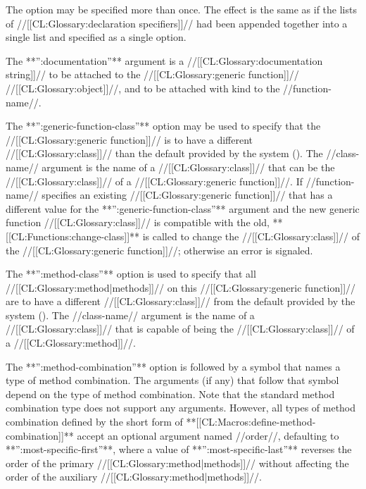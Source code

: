 The  option may be specified more than once. The effect is the same as if the lists of //[[CL:Glossary:declaration specifiers]]// had been appended together into a single list and specified as a single  option.

\itemitem{\bull} The **'':documentation''** argument is a //[[CL:Glossary:documentation string]]// to be attached to the //[[CL:Glossary:generic function]]// //[[CL:Glossary:object]]//, and to be attached with kind  to the //function-name//.

\itemitem{\bull} The **'':generic-function-class''** option may be used to specify that the //[[CL:Glossary:generic function]]// is to have a different //[[CL:Glossary:class]]// than the default provided by the system (). The //class-name// argument is the name of a //[[CL:Glossary:class]]// that can be the //[[CL:Glossary:class]]// of a //[[CL:Glossary:generic function]]//. If //function-name// specifies an existing //[[CL:Glossary:generic function]]// that has a different value for the **'':generic-function-class''** argument and the new generic function //[[CL:Glossary:class]]// is compatible with the old, **[[CL:Functions:change-class]]** is called to change the //[[CL:Glossary:class]]// of the //[[CL:Glossary:generic function]]//; otherwise an error is signaled.

\itemitem{\bull} The **'':method-class''** option is used to specify that all //[[CL:Glossary:method|methods]]// on this //[[CL:Glossary:generic function]]// are to have a different //[[CL:Glossary:class]]// from the default provided by the system (). The //class-name// argument is the name of a //[[CL:Glossary:class]]// that is capable of being the //[[CL:Glossary:class]]// of a //[[CL:Glossary:method]]//. 

\itemitem{\bull} The **'':method-combination''** option is followed by a symbol that names a type of method combination. The arguments (if any) that follow that symbol depend on the type of method combination. Note that the standard method combination type does not support any arguments. However, all types of method combination defined by the short form of **[[CL:Macros:define-method-combination]]** accept an optional argument named //order//, defaulting to **'':most-specific-first''**, where a value of **'':most-specific-last''** reverses the order of the primary //[[CL:Glossary:method|methods]]// without affecting the order of the auxiliary //[[CL:Glossary:method|methods]]//.

